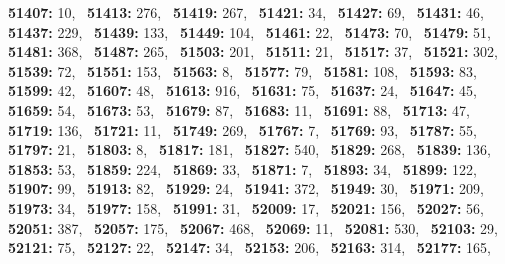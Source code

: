 \textbf{51407:} 10,\allowbreak~ 
\textbf{51413:} 276,\allowbreak~ 
\textbf{51419:} 267,\allowbreak~ 
\textbf{51421:} 34,\allowbreak~ 
\textbf{51427:} 69,\allowbreak~ 
\textbf{51431:} 46,\allowbreak~ 
\textbf{51437:} 229,\allowbreak~ 
\textbf{51439:} 133,\allowbreak~ 
\textbf{51449:} 104,\allowbreak~ 
\textbf{51461:} 22,\allowbreak~ 
\textbf{51473:} 70,\allowbreak~ 
\textbf{51479:} 51,\allowbreak~ 
\textbf{51481:} 368,\allowbreak~ 
\textbf{51487:} 265,\allowbreak~ 
\textbf{51503:} 201,\allowbreak~ 
\textbf{51511:} 21,\allowbreak~ 
\textbf{51517:} 37,\allowbreak~ 
\textbf{51521:} 302,\allowbreak~ 
\textbf{51539:} 72,\allowbreak~ 
\textbf{51551:} 153,\allowbreak~ 
\textbf{51563:} 8,\allowbreak~ 
\textbf{51577:} 79,\allowbreak~ 
\textbf{51581:} 108,\allowbreak~ 
\textbf{51593:} 83,\allowbreak~ 
\textbf{51599:} 42,\allowbreak~ 
\textbf{51607:} 48,\allowbreak~ 
\textbf{51613:} 916,\allowbreak~ 
\textbf{51631:} 75,\allowbreak~ 
\textbf{51637:} 24,\allowbreak~ 
\textbf{51647:} 45,\allowbreak~ 
\textbf{51659:} 54,\allowbreak~ 
\textbf{51673:} 53,\allowbreak~ 
\textbf{51679:} 87,\allowbreak~ 
\textbf{51683:} 11,\allowbreak~ 
\textbf{51691:} 88,\allowbreak~ 
\textbf{51713:} 47,\allowbreak~ 
\textbf{51719:} 136,\allowbreak~ 
\textbf{51721:} 11,\allowbreak~ 
\textbf{51749:} 269,\allowbreak~ 
\textbf{51767:} 7,\allowbreak~ 
\textbf{51769:} 93,\allowbreak~ 
\textbf{51787:} 55,\allowbreak~ 
\textbf{51797:} 21,\allowbreak~ 
\textbf{51803:} 8,\allowbreak~ 
\textbf{51817:} 181,\allowbreak~ 
\textbf{51827:} 540,\allowbreak~ 
\textbf{51829:} 268,\allowbreak~ 
\textbf{51839:} 136,\allowbreak~ 
\textbf{51853:} 53,\allowbreak~ 
\textbf{51859:} 224,\allowbreak~ 
\textbf{51869:} 33,\allowbreak~ 
\textbf{51871:} 7,\allowbreak~ 
\textbf{51893:} 34,\allowbreak~ 
\textbf{51899:} 122,\allowbreak~ 
\textbf{51907:} 99,\allowbreak~ 
\textbf{51913:} 82,\allowbreak~ 
\textbf{51929:} 24,\allowbreak~ 
\textbf{51941:} 372,\allowbreak~ 
\textbf{51949:} 30,\allowbreak~ 
\textbf{51971:} 209,\allowbreak~ 
\textbf{51973:} 34,\allowbreak~ 
\textbf{51977:} 158,\allowbreak~ 
\textbf{51991:} 31,\allowbreak~ 
\textbf{52009:} 17,\allowbreak~ 
\textbf{52021:} 156,\allowbreak~ 
\textbf{52027:} 56,\allowbreak~ 
\textbf{52051:} 387,\allowbreak~ 
\textbf{52057:} 175,\allowbreak~ 
\textbf{52067:} 468,\allowbreak~ 
\textbf{52069:} 11,\allowbreak~ 
\textbf{52081:} 530,\allowbreak~ 
\textbf{52103:} 29,\allowbreak~ 
\textbf{52121:} 75,\allowbreak~ 
\textbf{52127:} 22,\allowbreak~ 
\textbf{52147:} 34,\allowbreak~ 
\textbf{52153:} 206,\allowbreak~ 
\textbf{52163:} 314,\allowbreak~ 
\textbf{52177:} 165,\allowbreak~ 
